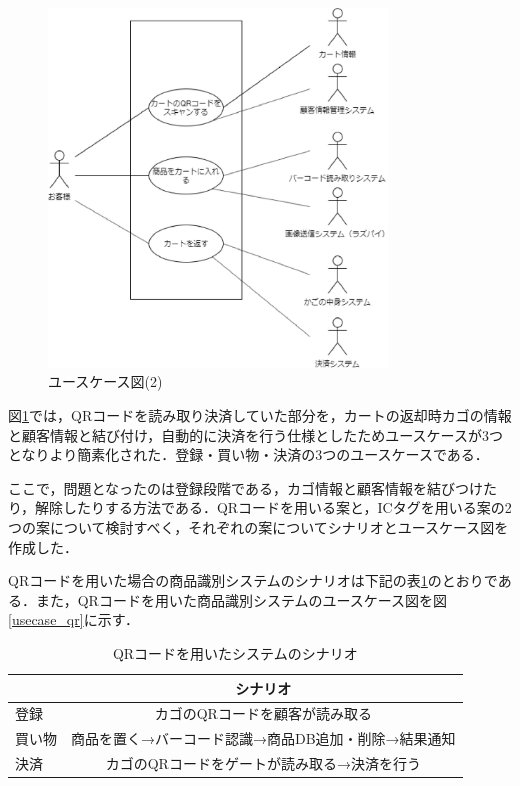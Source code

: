 \begin{figure}[htbp]
\centering
\includegraphics[width = 9cm]{./picture/usecase3.eps}
\caption{ユースケース図(2)}
\label{usecase3}
\end{figure}


図\ref{usecase3}では，QRコードを読み取り決済していた部分を，カートの返却時カゴの情報と顧客情報と結び付け，自動的に決済を行う仕様としたためユースケースが3つとなりより簡素化された．登録・買い物・決済の3つのユースケースである．

ここで，問題となったのは登録段階である，カゴ情報と顧客情報を結びつけたり，解除したりする方法である．QRコードを用いる案と，ICタグを用いる案の2つの案について検討すべく，それぞれの案についてシナリオとユースケース図を作成した．


QRコードを用いた場合の商品識別システムのシナリオは下記の表\ref{sina_qr}のとおりである．また，QRコードを用いた商品識別システムのユースケース図を図\ref{usecase_qr}に示す．


\begin{table}[htb]
\begin{center}
\caption{QRコードを用いたシステムのシナリオ}
\begin{tabular}{|l|c|} \hline
 & シナリオ \\ \hline \hline
登録 & カゴのQRコードを顧客が読み取る \\
買い物 & 商品を置く→バーコード認識→商品DB追加・削除→結果通知 \\
決済 & カゴのQRコードをゲートが読み取る→決済を行う \\ \hline
\end{tabular}
\label{sina_qr}
\end{center}
\end{table}


